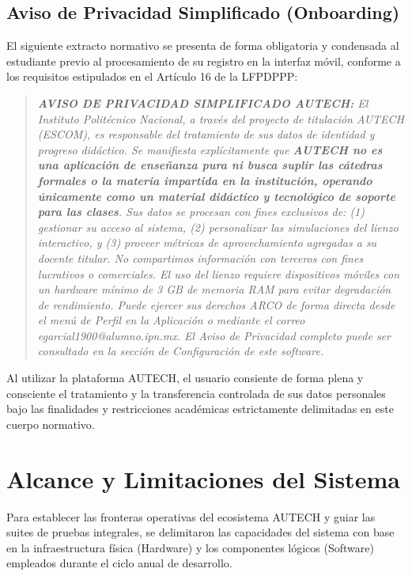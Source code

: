 \subsection{Aviso de Privacidad Simplificado (Onboarding)}
\label{subsec:privacidad_simplificado}

El siguiente extracto normativo se presenta de forma obligatoria y condensada al estudiante previo al procesamiento de su registro en la interfaz móvil, conforme a los requisitos estipulados en el Artículo 16 de la LFPDPPP:

\begin{quote}
    \small \textit{\textbf{AVISO DE PRIVACIDAD SIMPLIFICADO AUTECH:} El Instituto Politécnico Nacional, a través del proyecto de titulación AUTECH (ESCOM), es responsable del tratamiento de sus datos de identidad y progreso didáctico. Se manifiesta explícitamente que \textbf{AUTECH no es una aplicación de enseñanza pura ni busca suplir las cátedras formales o la materia impartida en la institución, operando únicamente como un material didáctico y tecnológico de soporte para las clases}. Sus datos se procesan con fines exclusivos de: (1) gestionar su acceso al sistema, (2) personalizar las simulaciones del lienzo interactivo, y (3) proveer métricas de aprovechamiento agregadas a su docente titular. No compartimos información con terceros con fines lucrativos o comerciales. El uso del lienzo requiere dispositivos móviles con un hardware mínimo de 3 GB de memoria RAM para evitar degradación de rendimiento. Puede ejercer sus derechos ARCO de forma directa desde el menú de Perfil en la Aplicación o mediante el correo egarcial1900@alumno.ipn.mx. El Aviso de Privacidad completo puede ser consultado en la sección de Configuración de este software.}
\end{quote}

Al utilizar la plataforma AUTECH, el usuario consiente de forma plena y consciente el tratamiento y la transferencia controlada de sus datos personales bajo las finalidades y restricciones académicas estrictamente delimitadas en este cuerpo normativo.

\section{Alcance y Limitaciones del Sistema}
\label{sec:alcance_limitaciones}

Para establecer las fronteras operativas del ecosistema AUTECH y guiar las suites de pruebas integrales, se delimitaron las capacidades del sistema con base en la infraestructura física (Hardware) y los componentes lógicos (Software) empleados durante el ciclo anual de desarrollo. 

